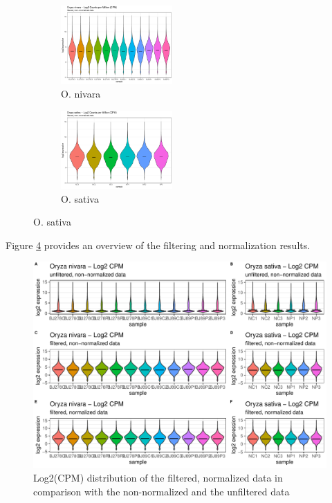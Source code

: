 \begin{figure}[htbp]
    \caption{Log2(CPM) distribution of the filtered, normalized data}
    \label{fig:2.4-Log2CPM-flt-norm}
    \begin{subfigure}[t]{0.64\linewidth}
        \caption{O. nivara}
        \label{fig:2.4-Log2CPM-flt-norm-Oryza_nivara}
        \includegraphics[width=\textwidth, height=3cm]{../../results/plots-and-tables/2.3-Log2CPM-flt-notnorm-Oryza_nivara}
    \end{subfigure}
    \begin{subfigure}[t]{0.32\linewidth}
        \caption{O. sativa}
        \label{fig:2.4-Log2CPM-flt-norm-Oryza_sativa}
        \includegraphics[width=\textwidth, height=3cm]{../../results/plots-and-tables/2.3-Log2CPM-flt-notnorm-Oryza_sativa}
    \end{subfigure}
\end{figure}

Figure \ref{fig:2.5-Log2CPM-Overview} provides an overview of the filtering and normalization results.

\begin{figure}[htbp]
    \caption{Log2(CPM) distribution of the filtered, normalized data in comparison with the non-normalized and the unfiltered data}
    \label{fig:2.5-Log2CPM-Overview}
    \includegraphics[width=\textwidth]{../../results/plots-and-tables/2.5-Log2CPM-Overview}
\end{figure}

